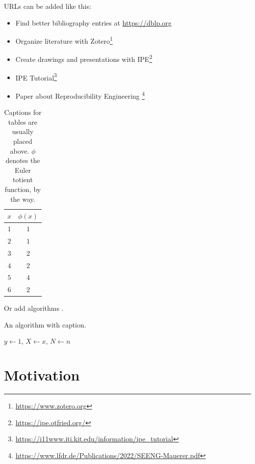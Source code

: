\clearpage

URLs can be added like this:

\begin{itemize}
    \item Find better bibliography entries at \url{https://dblp.org}
    \item Organize literature with Zotero\footnote{\url{https://www.zotero.org}}
    \item Create drawings and presentations with IPE\footnote{\url{https://ipe.otfried.org/}}
    \item IPE Tutorial\footnote{\url{https://i11www.iti.kit.edu/information/ipe_tutorial}}
    \item Paper about Reproducibility Engineering \cite{DBLP:conf/icse-seeng/MauererKS22}\footnote{\url{https://www.lfdr.de/Publications/2022/SEENG-Mauerer.pdf}}
\end{itemize}

\begin{table}[ht!]
    \centering
    \caption{Captions for tables are usually placed above. $\phi$ denotes the Euler totient function, by the way.}
    \label{tab:test}
    \begin{tabular}{c c}
        \hline
        $x$ & $\phi(x)$ \\
        \hline
        $1$ & $1$ \\
        $2$ & $1$ \\
        $3$ & $2$ \\
        $4$ & $2$ \\
        $5$ & $4$ \\
        $6$ & $2$ \\
        \hline
    \end{tabular}
\end{table}

Or add algorithms .

\begin{algorithm}
    \caption{An algorithm with caption. \cite{noauthor_algorithms_nodate}}
    \label{alg:two}
    $y \gets 1$,
    $X \gets x$,
    $N \gets n$\;
\end{algorithm}

\section{Motivation}
\label{sec:motivation}

